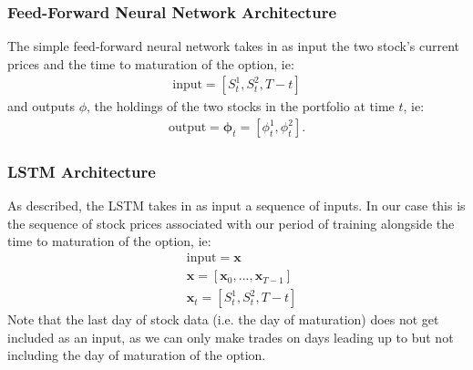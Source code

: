 \documentclass{article}
\theoremstyle{definition}
\begin{document}
\subsubsection{Feed-Forward Neural Network Architecture}
The simple feed-forward neural network takes in as input the two stock's current prices and the time to maturation of the option, ie: 
\begin{align*}
    \text{input} = \left[S^{1}_{t}, S^{2}_{t}, T-t\right]
\end{align*}
and outputs $\phi$, the holdings of the two stocks in the portfolio at time $t$, ie: 
\begin{align*}
    \text{output} = \boldsymbol{\phi}_{t} = \left[\phi^{1}_{t}, \phi^{2}_{t}\right].
\end{align*}

\subsubsection{LSTM Architecture}
As described, the LSTM takes in as input a sequence of inputs. In our case this is the sequence of stock prices associated with our period of training alongside the time to maturation of the option, ie:
\begin{align*}
    &\text{input} = \mathbf{x}\\
    &\mathbf{x} = [\mathbf{x}_0,...,\mathbf{x}_{T-1}]\\
    &\mathbf{x}_t = \left[S^{1}_{t}, S^{2}_{t}, T-t\right]
\end{align*}
Note that the last day of stock data (i.e. the day of maturation) does not get included as an input, as we can only make trades on days leading up to but not including the day of maturation of the option.
\end{document}
